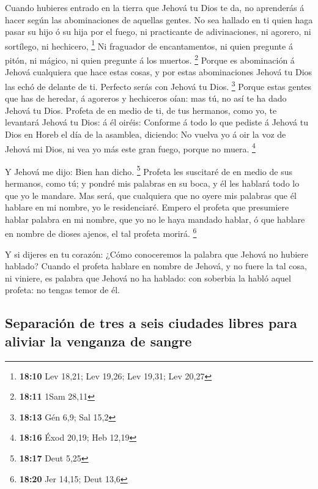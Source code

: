  Cuando hubieres entrado en la tierra que Jehová tu Dios te
da, no aprenderás á hacer según las abominaciones de aquellas gentes.
 No sea hallado en ti quien haga pasar su hijo ó su hija
por el fuego, ni practicante de adivinaciones, ni agorero, ni sortílego,
ni hechicero, \footnote{\textbf{18:10} Lev 18,21; Lev 19,26; Lev 19,31;
  Lev 20,27}  Ni fraguador de encantamentos, ni quien
pregunte á pitón, ni mágico, ni quien pregunte á los muertos.
\footnote{\textbf{18:11} 1Sam 28,11}  Porque es abominación
á Jehová cualquiera que hace estas cosas, y por estas abominaciones
Jehová tu Dios las echó de delante de ti.  Perfecto serás
con Jehová tu Dios. \footnote{\textbf{18:13} Gén 6,9; Sal 15,2}
 Porque estas gentes que has de heredar, á agoreros y
hechiceros oían: mas tú, no así te ha dado Jehová tu Dios. 
Profeta de en medio de ti, de tus hermanos, como yo, te levantará Jehová
tu Dios: á él oiréis:  Conforme á todo lo que pediste á
Jehová tu Dios en Horeb el día de la asamblea, diciendo: No vuelva yo á
oir la voz de Jehová mi Dios, ni vea yo más este gran fuego, porque no
muera. \footnote{\textbf{18:16} Éxod 20,19; Heb 12,19}

 Y Jehová me dijo: Bien han dicho. \footnote{\textbf{18:17}
  Deut 5,25}  Profeta les suscitaré de en medio de sus
hermanos, como tú; y pondré mis palabras en su boca, y él les hablará
todo lo que yo le mandare.  Mas será, que cualquiera que no
oyere mis palabras que él hablare en mi nombre, yo le residenciaré.
 Empero el profeta que presumiere hablar palabra en mi
nombre, que yo no le haya mandado hablar, ó que hablare en nombre de
dioses ajenos, el tal profeta morirá. \footnote{\textbf{18:20} Jer
  14,15; Deut 13,6}

 Y si dijeres en tu corazón: ¿Cómo conoceremos la palabra
que Jehová no hubiere hablado?  Cuando el profeta hablare
en nombre de Jehová, y no fuere la tal cosa, ni viniere, es palabra que
Jehová no ha hablado: con soberbia la habló aquel profeta: no tengas
temor de él.

\hypertarget{separaciuxf3n-de-tres-a-seis-ciudades-libres-para-aliviar-la-venganza-de-sangre}{%
\subsection{Separación de tres a seis ciudades libres para aliviar la
venganza de
sangre}\label{separaciuxf3n-de-tres-a-seis-ciudades-libres-para-aliviar-la-venganza-de-sangre}}

